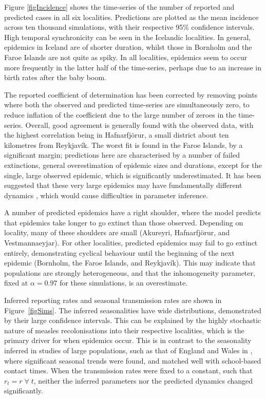 \documentclass[10pt]{article}
\begin{document}
Figure \ref{figIncidence} shows the time-series of the number of reported and predicted cases in all six localities. Predictions are plotted as the mean incidence across ten thousand simulations, with their respective 95\% confidence intervals. High temporal synchronicity can be seen in the Icelandic localities. In general, epidemics in Iceland are of shorter duration, whilst those in Bornholm and the Faroe Islands are not quite as spiky. In all localities, epidemics seem to occur more frequently in the latter half of the time-series, perhaps due to an increase in birth rates after the baby boom. 

The reported coefficient of determination has been corrected by removing points where both the observed and predicted time-series are simultaneously zero, to reduce inflation of the coefficient due to the large number of zeroes in the time-series. Overall, good agreement is generally found with the observed data, with the highest correlation being in Hafnarfj\"{o}r\dh{}ur, a small district about ten kilometres from Reykjav\'{i}k. The worst fit is found in the Faroe Islands, by a significant margin; predictions here are characterised by a number of failed extinctions, general overestimation of epidemic sizes and durations, except for the single, large observed epidemic, which is significantly underestimated. It has been suggested that these very large epidemics may have fundamentally different dynamics \cite{Rhodes1996}, which would cause difficulties in parameter inference.

A number of predicted epidemics have a right shoulder, where the model predicts that epidemics take longer to go extinct than those observed. Depending on locality, many of these shoulders are small (Akureyri, Hafnarfj\"{o}r\dh{}ur, and Vestmannaeyjar). For other localities, predicted epidemics may fail to go extinct entirely, demonstrating cyclical behaviour until the beginning of the next epidemic (Bornholm, the Faroe Islands, and Reykjav\'{i}k). This may indicate that populations are strongly heterogeneous, and that the inhomogeneity parameter, fixed at $\alpha=0.97$ for these simulations, is an overestimate.

Inferred reporting rates and seasonal transmission rates are shown in Figure~\ref{figSims}. The inferred seasonalities have wide distributions, demonstrated by their large confidence intervals. This can be explained by the highly stochastic nature of measles recolonisations into their respective localities, which is the primary driver for when epidemics occur. This is in contrast to the seasonality inferred in studies of large populations, such as that of England and Wales in \cite{Finkenstadt2000}, where significant seasonal trends were found, and matched well with school-based contact times. When the transmission rates were fixed to a constant, such that $r_t = r \; \forall \; t$, neither the inferred parameters nor the predicted dynamics changed significantly. 
\end{document}
